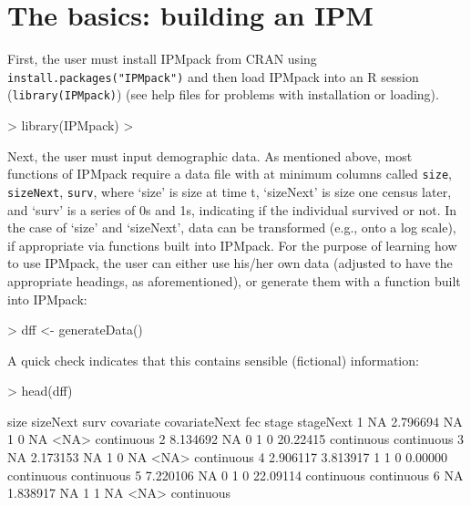 \documentclass{article}
\begin{document}
\section{The basics: building an IPM}

First, the user must install IPMpack from CRAN using
{\tt install.packages("IPMpack")} and then load IPMpack into an R session
({\tt library(IPMpack)}) (see help files for problems with installation or loading). 

\begin{Schunk}
\begin{Sinput}
> library(IPMpack)
> 
\end{Sinput}
\end{Schunk}
Next, the user must input demographic data. As mentioned above, most functions of IPMpack require a data file with at minimum columns called {\tt size}, {\tt sizeNext}, {\tt surv}, where `size' is size at time t, `sizeNext' is size one census later, and `surv' is a series of 0s and 1s, indicating if the individual survived or not. In the case of `size' and `sizeNext', data can be transformed (e.g., onto a log scale), if appropriate via functions built into IPMpack. For the purpose of learning how to use IPMpack, the user can either use his/her own data (adjusted to have the appropriate headings, as aforementioned), or generate them with a function built into IPMpack:

\begin{Schunk}
\begin{Sinput}
> dff <- generateData()
\end{Sinput}
\end{Schunk}
A quick check indicates that this contains sensible (fictional) information: 
\begin{Schunk}
\begin{Sinput}
> head(dff)
\end{Sinput}
\begin{Soutput}
      size sizeNext surv covariate covariateNext      fec      stage  stageNext
1       NA 2.796694   NA         1             0       NA       <NA> continuous
2 8.134692       NA    0         1             0 20.22415 continuous continuous
3       NA 2.173153   NA         1             0       NA       <NA> continuous
4 2.906117 3.813917    1         1             0  0.00000 continuous continuous
5 7.220106       NA    0         1             0 22.09114 continuous continuous
6       NA 1.838917   NA         1             1       NA       <NA> continuous
\end{Soutput}
\end{Schunk}
\end{document}
